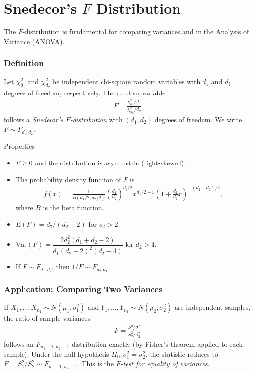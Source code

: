 \section{Snedecor's $F$ Distribution}

The $F$-distribution is fundamental for comparing variances and in the Analysis of Variance (ANOVA).

\subsubsection{Definition}

\begin{definicion}[$F$-Distribution]
Let $\chi^2_{d_1}$ and $\chi^2_{d_2}$ be independent chi-square random variables with $d_1$ and $d_2$ degrees of freedom, respectively. The random variable
\begin{align}
 \label{eq:3.2.15}
 F = \frac{\chi^2_{d_1}/d_1}{\chi^2_{d_2}/d_2}
\end{align}
follows a \emph{Snedecor's $F$-distribution} with $(d_1, d_2)$ degrees of freedom. We write $F \sim F_{d_1, d_2}$.
\end{definicion}

{Properties}
\begin{itemize}
 \item $F \geq 0$ and the distribution is asymmetric (right-skewed).
 \item The probability density function of $F$ is
 \begin{align}
  \label{eq:3.2.16}
  f(x) = \frac{1}{B(d_1/2, d_2/2)} \left(\frac{d_1}{d_2}\right)^{d_1/2}
  x^{d_1/2 - 1} \left(1 + \frac{d_1}{d_2}x\right)^{-(d_1+d_2)/2},
  \end{align}
  where $B$ is the beta function.
 \item $E(F) = d_2/(d_2 - 2)$ for $d_2 > 2$.
 \item $\text{Var}(F) = \dfrac{2 d_2^2 (d_1 + d_2 - 2)}{d_1 (d_2 - 2)^2 (d_2 - 4)}$ for $d_2 > 4$.
 \item If $F \sim F_{d_1, d_2}$, then $1/F \sim F_{d_2, d_1}$.
\end{itemize}

\subsubsection{Application: Comparing Two Variances}

If $X_1, \ldots, X_{n_1} \sim N(\mu_1, \sigma_1^2)$ and $Y_1, \ldots, Y_{n_2} \sim N(\mu_2, \sigma_2^2)$ are independent samples, the ratio of sample variances
\begin{align}
 \label{eq:3.2.17}
 F = \frac{S_1^2/\sigma_1^2}{S_2^2/\sigma_2^2}
\end{align}
follows an $F_{n_1 - 1, n_2 - 1}$ distribution exactly (by Fisher's theorem applied to each sample). Under the null hypothesis $H_0: \sigma_1^2 = \sigma_2^2$, the statistic reduces to $F = S_1^2/S_2^2 \sim F_{n_1-1, n_2-1}$. This is the \emph{$F$-test for equality of variances}.

